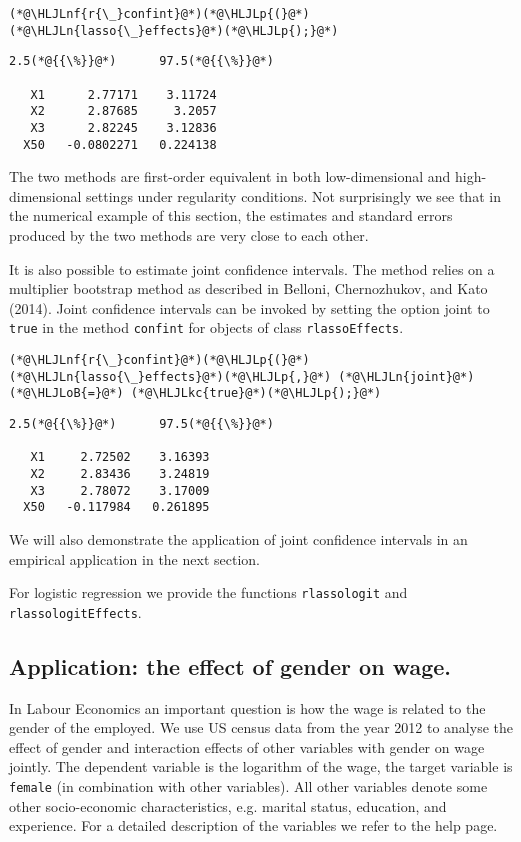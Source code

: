 \documentclass[12pt,a4paper]{article}
\newcommand{\HLJLkc}[1]{\textcolor[RGB]{59,151,46}{\textit{#1}}}
\newcommand{\HLJLn}[1]{#1}
\newcommand{\HLJLnf}[1]{\textcolor[RGB]{66,102,213}{#1}}
\newcommand{\HLJLoB}[1]{\textcolor[RGB]{102,102,102}{\textbf{#1}}}
\newcommand{\HLJLp}[1]{#1}
\begin{document}
\begin{lstlisting}
(*@\HLJLnf{r{\_}confint}@*)(*@\HLJLp{(}@*)(*@\HLJLn{lasso{\_}effects}@*)(*@\HLJLp{);}@*)
\end{lstlisting}

\begin{lstlisting}
2.5(*@{{\%}}@*)      97.5(*@{{\%}}@*)

   X1      2.77171    3.11724
   X2      2.87685     3.2057
   X3      2.82245    3.12836
  X50   -0.0802271   0.224138
\end{lstlisting}


The two methods are first-order equivalent in both low-dimensional and high-dimensional settings under regularity conditions. Not surprisingly we see that in the numerical example of this section, the estimates and standard errors produced by the two methods are very close to each other.

It is also possible to estimate joint confidence intervals. The method relies on a multiplier bootstrap method as described in Belloni, Chernozhukov, and Kato (2014). Joint confidence intervals can be invoked by setting the option joint to \texttt{true} in the method \texttt{confint} for objects of class \texttt{rlassoEffects}.


\begin{lstlisting}
(*@\HLJLnf{r{\_}confint}@*)(*@\HLJLp{(}@*)(*@\HLJLn{lasso{\_}effects}@*)(*@\HLJLp{,}@*) (*@\HLJLn{joint}@*) (*@\HLJLoB{=}@*) (*@\HLJLkc{true}@*)(*@\HLJLp{);}@*)
\end{lstlisting}

\begin{lstlisting}
2.5(*@{{\%}}@*)      97.5(*@{{\%}}@*)

   X1     2.72502    3.16393
   X2     2.83436    3.24819
   X3     2.78072    3.17009
  X50   -0.117984   0.261895
\end{lstlisting}


We will also demonstrate the application of joint confidence intervals in an empirical application in the next section.

% 
For logistic regression we provide the functions \texttt{rlassologit} and \texttt{rlassologitEffects}.

\subsection{Application: the effect of gender on wage.}
In Labour Economics an important question is how the wage is related to the gender of the employed. We use US census data from the year 2012 to analyse the effect of gender and interaction effects of other variables with gender on wage jointly. The dependent variable is the logarithm of the wage, the target variable is \texttt{female} (in combination with other variables). All other variables denote some other socio-economic characteristics, e.g. marital status, education, and experience. For a detailed description of the variables we refer to the help page.
\end{document}
